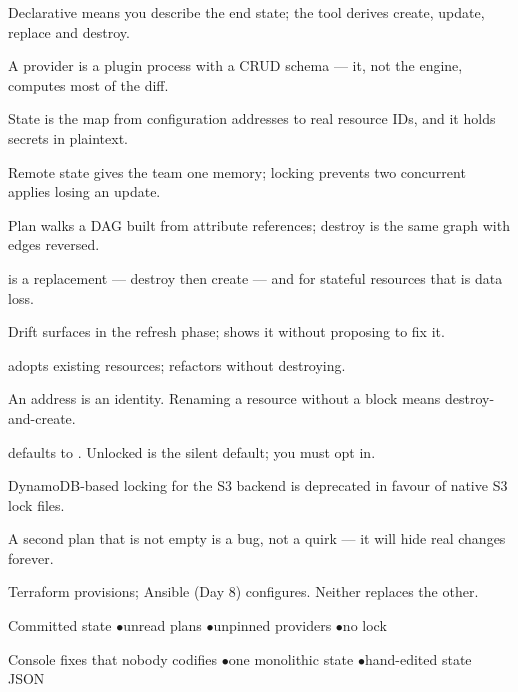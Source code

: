 \begin{tickcheck}
  \item Declarative means you describe the end state; the tool derives create, update, replace and destroy.
  \item A provider is a plugin process with a CRUD schema --- it, not the engine, computes most of the diff.
  \item State is the map from configuration addresses to real resource IDs, and it holds secrets in plaintext.
  \item Remote state gives the team one memory; locking prevents two concurrent applies losing an update.
  \item Plan walks a DAG built from attribute references; destroy is the same graph with edges reversed.
  \item \code{-/+} is a replacement --- destroy then create --- and for stateful resources that is data loss.
  \item Drift surfaces in the refresh phase;  shows it without proposing to fix it.
  \item {} adopts existing resources;  refactors without destroying.
\end{tickcheck}

\begin{wbitem}
  \item An address is an identity. Renaming a resource without a  block means destroy-and-create.
  \item {} defaults to . Unlocked is the silent default; you must opt in.
  \item DynamoDB-based locking for the S3 backend is deprecated in favour of native S3 lock files.
  \item A second plan that is not empty is a bug, not a quirk --- it will hide real changes forever.
  \item Terraform provisions; Ansible (Day 8) configures. Neither replaces the other.
\end{wbitem}

\begin{wbitem}
  \item Committed state \quad$\bullet$\quad unread plans \quad$\bullet$\quad unpinned providers \quad$\bullet$\quad no lock
  \item Console fixes that nobody codifies \quad$\bullet$\quad one monolithic state \quad$\bullet$\quad hand-edited state JSON
\end{wbitem}

